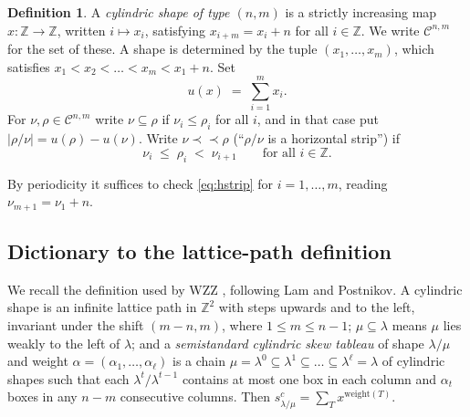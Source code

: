\documentclass[11pt]{article}
\theoremstyle{plain}
\theoremstyle{definition}
\newtheorem{defn}[thm]{Definition}
\newcommand{\Z}{\mathbb{Z}}
\newcommand{\cyl}{\mathcal{C}}
\newcommand{\hstrip}{\prec\!\!\prec}
\begin{document}
\begin{defn}\label{def:shape}
A \emph{cylindric shape of type $(n,m)$} is a strictly increasing map $x:\Z\to\Z$, written
$i\mapsto x_i$, satisfying $x_{i+m}=x_i+n$ for all $i\in\Z$. We write $\cyl^{n,m}$ for the set
of these. A shape is determined by the tuple $(x_1,\dots,x_m)$, which satisfies
$x_1<x_2<\dots<x_m<x_1+n$. Set
\[
  u(x)\;=\;\sum_{i=1}^{m}x_i .
\]
For $\nu,\rho\in\cyl^{n,m}$ write $\nu\subseteq\rho$ if $\nu_i\le\rho_i$ for all $i$, and in
that case put $|\rho/\nu|=u(\rho)-u(\nu)$. Write $\nu\hstrip\rho$ (``$\rho/\nu$ is a
horizontal strip'') if
\begin{equation}\label{eq:hstrip}
  \nu_i\;\le\;\rho_i\;<\;\nu_{i+1}\qquad\text{for all }i\in\Z .
\end{equation}
\end{defn}

By periodicity it suffices to check \eqref{eq:hstrip} for $i=1,\dots,m$, reading
$\nu_{m+1}=\nu_1+n$.

\subsection{Dictionary to the lattice-path definition}

We recall the definition used by WZZ \cite[\S5]{WZZ}, following Lam and Postnikov. A cylindric
shape is an infinite lattice path in $\Z^2$ with steps upwards and to the left, invariant under
the shift $(m-n,m)$, where $1\le m\le n-1$; $\mu\subseteq\lambda$ means $\mu$ lies weakly to
the left of $\lambda$; and a \emph{semistandard cylindric skew tableau} of shape $\lambda/\mu$
and weight $\alpha=(\alpha_1,\dots,\alpha_\ell)$ is a chain
$\mu=\lambda^0\subseteq\lambda^1\subseteq\dots\subseteq\lambda^\ell=\lambda$ of cylindric
shapes such that each $\lambda^{t}/\lambda^{t-1}$ contains at most one box in each column and
$\alpha_t$ boxes in any $n-m$ consecutive columns. Then
$s^{c}_{\lambda/\mu}=\sum_{T}x^{\mathrm{weight}(T)}$.
\end{document}
